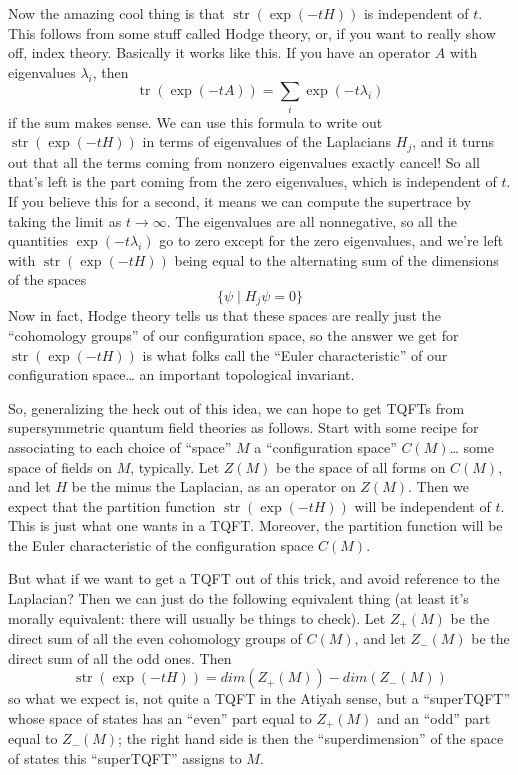 \documentclass{article}
\begin{document}
Now the amazing cool thing is that \(\operatorname{str}(\exp(-tH))\) is
independent of \(t\). This follows from some stuff called Hodge theory,
or, if you want to really show off, index theory. Basically it works
like this. If you have an operator \(A\) with eigenvalues \(\lambda_i\),
then \[\operatorname{tr}(\exp(-tA)) = \sum_i \exp(-t \lambda_i)\] if the
sum makes sense. We can use this formula to write out
\(\operatorname{str}(\exp(-tH))\) in terms of eigenvalues of the
Laplacians \(H_j\), and it turns out that all the terms coming from
nonzero eigenvalues exactly cancel! So all that's left is the part
coming from the zero eigenvalues, which is independent of \(t\). If you
believe this for a second, it means we can compute the supertrace by
taking the limit as \(t\to\infty\). The eigenvalues are all nonnegative,
so all the quantities \(\exp(-t \lambda_i)\) go to zero except for the
zero eigenvalues, and we're left with \(\operatorname{str}(\exp(-tH))\)
being equal to the alternating sum of the dimensions of the spaces
\[\{\psi \mid H_j \psi = 0\}\] Now in fact, Hodge theory tells us that
these spaces are really just the ``cohomology groups'' of our
configuration space, so the answer we get for
\(\operatorname{str}(\exp(-tH))\) is what folks call the ``Euler
characteristic'' of our configuration space\ldots{} an important
topological invariant.

So, generalizing the heck out of this idea, we can hope to get TQFTs
from supersymmetric quantum field theories as follows. Start with some
recipe for associating to each choice of ``space'' \(M\) a
``configuration space'' \(C(M)\)\ldots{} some space of fields on \(M\),
typically. Let \(Z(M)\) be the space of all forms on \(C(M)\), and let
\(H\) be the minus the Laplacian, as an operator on \(Z(M)\). Then we
expect that the partition function \(\operatorname{str}(\exp(-tH))\)
will be independent of \(t\). This is just what one wants in a TQFT.
Moreover, the partition function will be the Euler characteristic of the
configuration space \(C(M)\).

But what if we want to get a TQFT out of this trick, and avoid reference
to the Laplacian? Then we can just do the following equivalent thing (at
least it's morally equivalent: there will usually be things to check).
Let \(Z_+(M)\) be the direct sum of all the even cohomology groups of
\(C(M)\), and let \(Z_-(M)\) be the direct sum of all the odd ones. Then
\[\operatorname{str}(\exp(-tH)) = dim(Z_+(M))-dim(Z_-(M))\] so what we
expect is, not quite a TQFT in the Atiyah sense, but a ``superTQFT''
whose space of states has an ``even'' part equal to \(Z_+(M)\) and an
``odd'' part equal to \(Z_-(M)\); the right hand side is then the
``superdimension'' of the space of states this ``superTQFT'' assigns to
\(M\).
\end{document}
